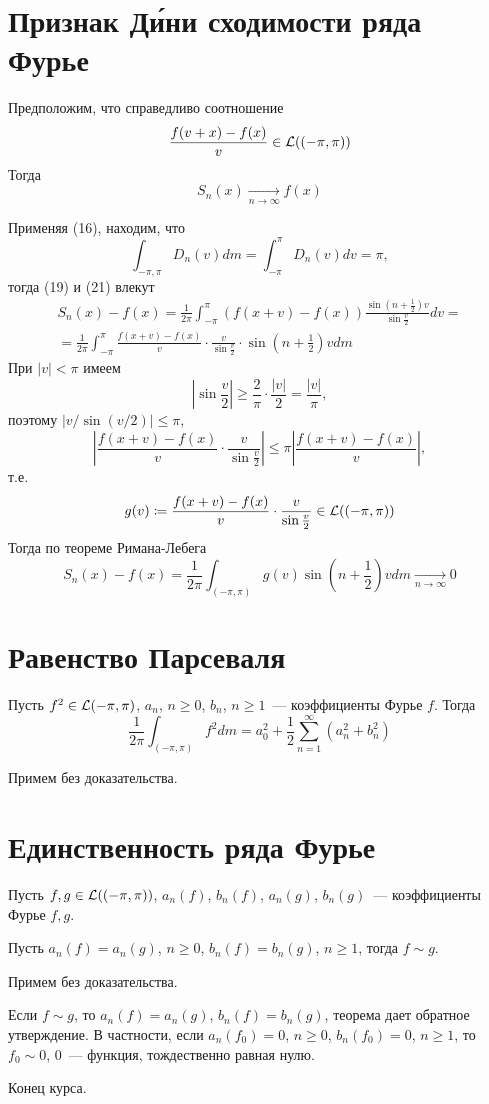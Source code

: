 \documentclass[main]{subfiles}
\begin{document}
\section{Признак \texorpdfstring{Д\'ини}{Дини} сходимости ряда Фурье}
\begin{theorem}
    Предположим, что справедливо соотношение
    \[\frac{f(v + x) - f(x)}{v} \in \mathcal{L}((-\pi, \pi))\]
    Тогда
    \[S_n(x) \xrightarrow[n \to \infty]{} f(x) \tag{20}\]
\end{theorem}
\begin{longProof}
    Применяя (16), находим, что
    \[\int_{-\pi, \pi} D_n(v) dm = \int_{-\pi}^{\pi} D_n(v) dv = \pi, \tag{21}\]
    тогда (19) и (21) влекут
    \begin{multline*}
        S_n(x) - f(x) = \frac{1}{2 \pi} \int_{-\pi}^{\pi} (f(x + v) - f(x))  \frac{\sin \left(n + \frac{1}{2}\right)v}{\sin \frac{v}{2}} dv = \\
        = \frac{1}{2 \pi} \int_{-\pi}^{\pi} \frac{f(x + v) - f(x)}{v} \cdot \frac{v}{\sin \frac{v}{2}} \cdot \sin\left(n + \frac{1}{2}\right) v dm \tag{22}
    \end{multline*}
    При $|v| < \pi$ имеем
    \[\left|\sin \frac{v}{2}\right| \ge \frac{2}{\pi} \cdot \frac{|v|}{2} = \frac{|v|}{\pi},\]
    поэтому $|v / \sin(v / 2)| \le \pi$,
    \[\left|\frac{f(x + v) - f(x)}{v} \cdot \frac{v}{\sin \frac{v}{2}}\right| \le \pi \left|\frac{f(x + v) - f(x)}{v}\right|,\]
    т.е.
    \[g(v) \coloneq \frac{f(x + v) - f(x)}{v} \cdot \frac{v}{\sin \frac{v}{2}} \in \mathcal{L}((-\pi, \pi))\]
    Тогда по теореме Римана-Лебега
    \[S_n(x) - f(x) = \frac{1}{2 \pi} \int_{(-\pi, \pi)} g(v) \sin\left(n + \frac{1}{2}\right) v dm \xrightarrow[n \to \infty]{} 0\]
\end{longProof}

\section{Равенство Парсеваля}
\begin{theorem}
    Пусть $f^2 \in \mathcal{L}(-\pi, \pi)$, $a_n$, $n \ge 0$, $b_n$, $n \ge 1$~--- коэффициенты Фурье $f$.
    Тогда
    \[\frac{1}{2 \pi} \int_{(-\pi, \pi)} f^2 dm = a^2_0 + \frac{1}{2} \sum_{n=1}^{\infty} (a^2_n + b^2_n)\]
\end{theorem}
Примем без доказательства.

\section{Единственность ряда Фурье}
\begin{theorem}
    Пусть $f, g \in \mathcal{L}((-\pi, \pi))$, $a_n(f)$, $b_n(f)$, $a_n(g)$, $b_n(g)$~--- коэффициенты Фурье $f, g$.

    Пусть $a_n(f) = a_n(g)$, $n \ge 0$, $b_n(f) = b_n(g)$, $n \ge 1$, тогда $f \sim g$.
\end{theorem}
Примем без доказательства.

Если $f \sim g$, то $a_n(f) = a_n(g)$, $b_n(f) = b_n(g)$, теорема дает обратное утверждение.
В частности, если $a_n(f_0) = 0$, $n \ge 0$, $b_n(f_0) = 0$, $n \ge 1$, то $f_0 \sim 0$, $0$~--- функция, тождественно равная нулю.

Конец курса.
\end{document}

